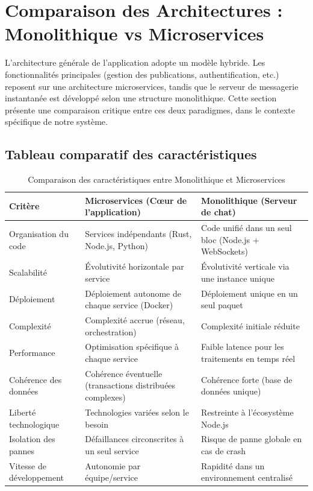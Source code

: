 \documentclass{rapportPfe}
\begin{document}
\section{Comparaison des Architectures : Monolithique vs Microservices}

L’architecture générale de l’application adopte un modèle hybride. Les fonctionnalités principales (gestion des publications, authentification, etc.) reposent sur une architecture microservices, tandis que le serveur de messagerie instantanée est développé selon une structure monolithique. Cette section présente une comparaison critique entre ces deux paradigmes, dans le contexte spécifique de notre système.

\subsection{Tableau comparatif des caractéristiques}


\begin{table}[H]
\centering
\begin{tabular}{|p{4cm}|p{5.5cm}|p{5.5cm}|}
\hline
\textbf{Critère} & \textbf{Microservices (Cœur de l'application)} & \textbf{Monolithique (Serveur de chat)} \\
\hline
Organisation du code & Services indépendants (Rust, Node.js, Python) & Code unifié dans un seul bloc (Node.js + WebSockets) \\
\hline
Scalabilité & Évolutivité horizontale par service & Évolutivité verticale via une instance unique \\
\hline
Déploiement & Déploiement autonome de chaque service (Docker) & Déploiement unique en un seul paquet \\
\hline
Complexité & Complexité accrue (réseau, orchestration) & Complexité initiale réduite \\
\hline
Performance & Optimisation spécifique à chaque service & Faible latence pour les traitements en temps réel \\
\hline
Cohérence des données & Cohérence éventuelle (transactions distribuées complexes) & Cohérence forte (base de données unique) \\
\hline
Liberté technologique & Technologies variées selon le besoin & Restreinte à l’écosystème Node.js \\
\hline
Isolation des pannes & Défaillances circonscrites à un seul service & Risque de panne globale en cas de crash \\
\hline
Vitesse de développement & Autonomie par équipe/service & Rapidité dans un environnement centralisé \\
\hline
\end{tabular}
\caption{Comparaison des caractéristiques entre Monolithique et Microservices}
\label{tab:Arch-comp}
\end{table}
\end{document}
